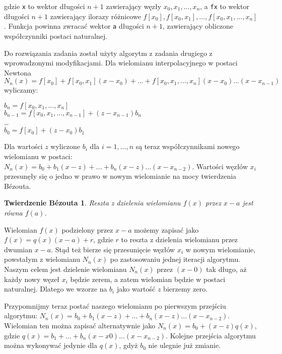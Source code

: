 \documentclass[a4paper]{article}
\theoremstyle{plain}
\newtheorem*{theorem*}{Twierdzenie Bézouta}
\begin{document}
gdzie \texttt{x} to wektor długości $n + 1$ zawierający węzły $x_{0}, x_{1}, ..., x_{n}$, a \texttt{fx} to wektor długości $n + 1$ zawierający ilorazy różnicowe $f[x_{0}], f[x_{0}, x_{1}], ..., f[x_{0}, x_{1}, ..., x_{n}]$. Funkcja powinna zwracać wektor \texttt{a} długości $n + 1$, zawierający obliczone współczynniki postaci naturalnej.

Do rozwiązania zadania został użyty algorytm z zadania drugiego z wprowadzonymi modyfikacjami. Dla wielomianu interpolacyjnego w postaci Newtona $N_{n}(x) = f[x_{0}] + f[x_{0}, x_{1}](x - x_{0}) + ... + f[x_{0}, x_{1}, ..., x_{n}](x - x_{0})...(x-x_{n - 1})$ wyliczamy:

\begin{center}
$b_{n} = f[x_{0}, x_{1}, ..., x_{n}]$\\
$b_{n - 1} = f[x_{0}, x_{1}, ..., x_{n - 1}] + (z - x_{n-1})b_{n}$\\
\ldots \\
$b_{0} = f[x_{0}] + (z - x_{0})b_{1}$
\end{center}

Dla wartości $z$ wyliczone $b_{i}$ dla $i = 1, ..., n$ są teraz współczynnikami nowego wielomianu w postaci: $N_{n}(x) = b_{0} + b_{1}(x - z) + ... + b_{n}(x - z)...(x-x_{n - 2})$. Wartości węzłów $x_{i}$ przesunęły się o jedno w prawo w nowym wielomianie na mocy twierdzenia Bézouta.
\begin{theorem*}
Reszta z dzielenia wielomianu $f(x)$ przez $x - a$ jest równa $f(a)$.
\end{theorem*} 

Wielomian $f(x)$ podzielony przez $x - a$ możemy zapisać jako $f(x) = q(x)(x-a) + r$, gdzie $r$ to reszta z dzielenia wielomianu przez dwumian $x - a$. Stąd też bierze się przesunięcie węzłów $x_{i}$ w nowym wielomianie, powstałym z wielomianu $N_{n}(x)$ po zastosowaniu jednej iteracji algorytmu. Naszym celem jest dzielenie wielomianu $N_{n}(x)$ przez $(x - 0)$ tak długo, aż każdy nowy węzeł $x_{i}$ będzie zerem, a zatem wielomian będzie w postaci naturalnej. Dlatego we wzorze na $b_{i}$ jako wartość $z$ bierzemy zero.

Przypomnijmy teraz postać naszego wielomianu po pierwszym przejściu algorytmu: $N_{n}(x) = b_{0} + b_{1}(x - z) + ... + b_{n}(x - z)...(x-x_{n - 2})$. Wielomian ten można zapisać alternatywnie jako $N_{n}(x) = b_{0} + (x - z)q(x)$, gdzie $q(x) = b_{1} + ... + b_{n}(x-x{0})...(x-x_{n - 2})$.
Kolejne przejścia algorytmu można wykonywać jedynie dla $q(x)$, gdyż $b_{0}$ nie ulegnie już zmianie.
\end{document}
